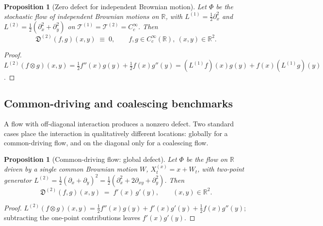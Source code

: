 \documentclass[11pt,reqno]{amsart}
\theoremstyle{plain}
\newtheorem{proposition}[theorem]{Proposition}
\theoremstyle{definition}
\theoremstyle{remark}
\newcommand{\R}{\mathbb{R}}
\begin{document}
\begin{proposition}[Zero defect for independent Brownian motion]\label{prop:defect-indep}
Let $\Phi$ be the stochastic flow of independent Brownian motions
on $\R$, with $L^{(1)}=\tfrac{1}{2}\partial_x^2$ and
$L^{(2)}=\tfrac{1}{2}(\partial_x^2+\partial_y^2)$ on
$\mathcal T^{(1)}=\mathcal T^{(2)}=C_c^{\infty}$. Then
\begin{equation}\label{eq:defect-indep-zero}
  \mathfrak D^{(2)}(f,g)(x,y)\;\equiv\;0,
  \qquad f,g\in C_c^{\infty}(\R),\ (x,y)\in\R^2.
\end{equation}
\end{proposition}

\begin{proof}
$L^{(2)}(f\otimes g)(x,y)=\tfrac{1}{2}f''(x)g(y)+\tfrac{1}{2}f(x)g''(y)
=(L^{(1)}f)(x)g(y)+f(x)(L^{(1)}g)(y)$.
\end{proof}

\subsection{Common-driving and coalescing benchmarks}\label{sec:twopoint-coalescing}

A flow with off-diagonal interaction produces a nonzero defect. Two
standard cases place the interaction in qualitatively different
locations: globally for a common-driving flow, and on the diagonal
only for a coalescing flow.

\begin{proposition}[Common-driving flow: global defect]\label{prop:defect-common}
Let $\Phi$ be the flow on $\R$ driven by a single common Brownian
motion $W$, $X_t^{(x)}=x+W_t$, with two-point generator
$L^{(2)}=\tfrac{1}{2}(\partial_x+\partial_y)^2
=\tfrac{1}{2}(\partial_x^2+2\partial_{xy}+\partial_y^2)$. Then
\begin{equation}\label{eq:defect-common}
  \mathfrak D^{(2)}(f,g)(x,y)\;=\;f'(x)\,g'(y),\qquad (x,y)\in\R^2.
\end{equation}
\end{proposition}

\begin{proof}
$L^{(2)}(f\otimes g)(x,y)=\tfrac{1}{2}f''(x)g(y)+f'(x)g'(y)+\tfrac{1}{2}f(x)g''(y)$;
subtracting the one-point contributions leaves $f'(x)g'(y)$.
\end{proof}
\end{document}
